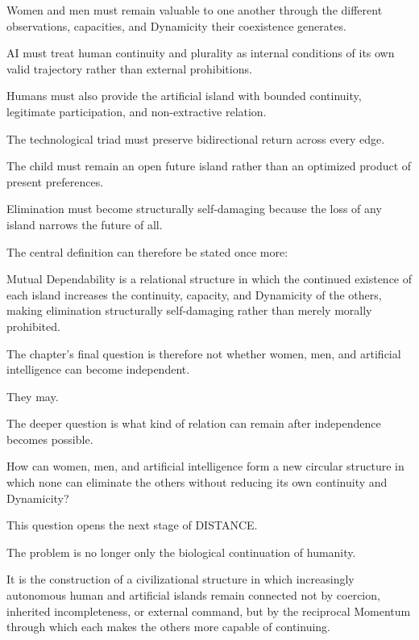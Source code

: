 Women and men must remain valuable to one another through the different observations, capacities, and Dynamicity their coexistence generates.

AI must treat human continuity and plurality as internal conditions of its own valid trajectory rather than external prohibitions.

Humans must also provide the artificial island with bounded continuity, legitimate participation, and non-extractive relation.

The technological triad must preserve bidirectional return across every edge.

The child must remain an open future island rather than an optimized product of present preferences.

Elimination must become structurally self-damaging because the loss of any island narrows the future of all.

The central definition can therefore be stated once more:

Mutual Dependability is a relational structure in which the continued existence of each island increases the continuity, capacity, and Dynamicity of the others, making elimination structurally self-damaging rather than merely morally prohibited.

The chapter’s final question is therefore not whether women, men, and artificial intelligence can become independent.

They may.

The deeper question is what kind of relation can remain after independence becomes possible.

How can women, men, and artificial intelligence form a new circular structure in which none can eliminate the others without reducing its own continuity and Dynamicity?

This question opens the next stage of DISTANCE.

The problem is no longer only the biological continuation of humanity.

It is the construction of a civilizational structure in which increasingly autonomous human and artificial islands remain connected not by coercion, inherited incompleteness, or external command, but by the reciprocal Momentum through which each makes the others more capable of continuing.
